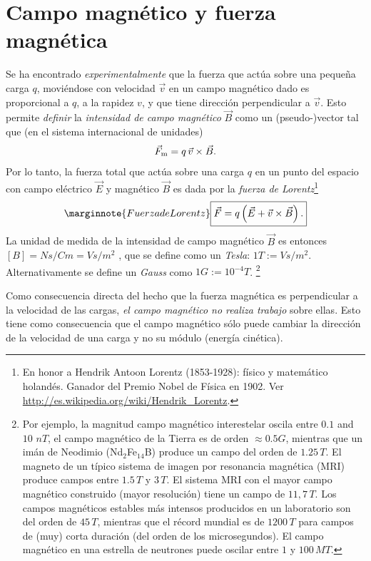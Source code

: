 \section{Campo magnético y fuerza magnética}
Se ha encontrado \textit{experimentalmente} que la fuerza que actúa sobre una pequeña carga $q$, moviéndose con velocidad $\vec{v}$ en un campo magnético dado es proporcional a $q$, a la rapidez $v$, y que tiene dirección perpendicular a $\vec{v}$. Esto permite \textit{definir}  la \textit{intensidad de campo magnético} $\vec{B}$ como un (pseudo-)vector tal que (en el sistema internacional de unidades)
\begin{equation}
 \vec{F}_{\rm m}=q\,\vec{v}\times\vec{B}.
\end{equation}
Por lo tanto, la fuerza total que actúa sobre una carga $q$ en un punto del espacio con campo eléctrico $\vec{E}$ y magnético $\vec{B}$ es dada por la \textit{fuerza de Lorentz}\footnote{En honor a Hendrik Antoon Lorentz (1853-1928): físico y matemático holandés. Ganador del Premio Nobel de Física en 1902. Ver \url{http://es.wikipedia.org/wiki/Hendrik_Lorentz}.}
\begin{equation}\marginnote{Fuerza de Lorentz}
\boxed{ \vec{F}=q\left(\vec{E}+\vec{v}\times\vec{B}\right).}
\end{equation}
La unidad de medida de la intensidad de campo magnético $\vec{B}$ es entonces  $[B]=Ns/Cm=Vs/m^2$ , que se define como un \textit{Tesla}: $1T:=Vs/m^2$. Alternativamente se define un
\textit{Gauss} como $1G:=10^{-4}T$. \footnote{Por ejemplo, la magnitud campo
magnético interestelar oscila entre $0.1$ and $10$ $nT$, el campo magnético
de la Tierra es de orden $\approx 0.5 G$, mientras que un imán
de Neodimio (Nd${}_2$Fe${}_{14}$B) produce un campo del orden de $1.25\, T$.
El magneto de un típico sistema de imagen por resonancia magnética (MRI) produce campos entre $1.5\,T$ y $3\,T$. El sistema MRI con el mayor campo magnético construido (mayor resolución) tiene un campo de $11,7\,T$. Los campos magnéticos estables más intensos producidos en un laboratorio son del orden de $45\,T$, mientras que el récord mundial es de $1200\,T$ \cite{Brecord2018} para campos de (muy) corta duración (del orden de los microsegundos). El campo magnético en una estrella de neutrones puede oscilar entre $1$ y $100\, MT$.}

Como consecuencia directa del hecho que la fuerza magnética es perpendicular a
la velocidad de las cargas, \textit{el campo magnético no realiza trabajo} sobre ellas.
Esto tiene como consecuencia que el campo magnético sólo puede cambiar la
dirección de la velocidad de una carga y no su módulo (energía cinética).

